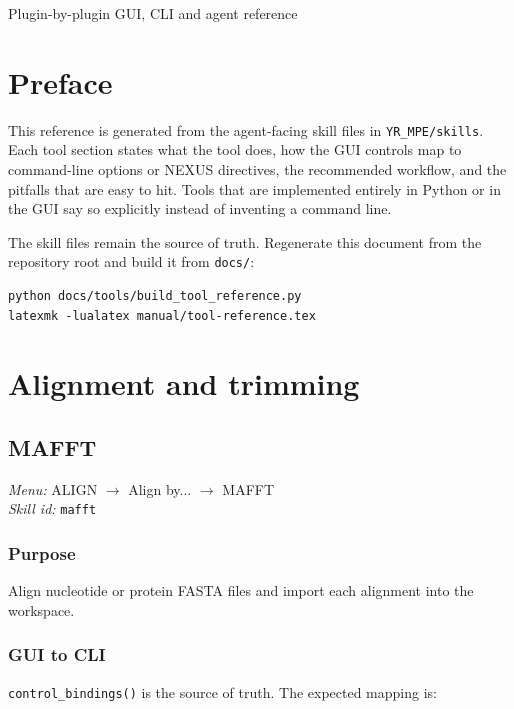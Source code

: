 \documentclass[11pt]{report}
\begin{document}
  {Plugin-by-plugin GUI, CLI and agent reference}
\setcounter{tocdepth}{1}
\tableofcontents
\chapter*{Preface}
This reference is generated from the agent-facing skill files in \texttt{YR\_MPE/skills}. Each tool section states what the tool does, how the GUI controls map to command-line options or NEXUS directives, the recommended workflow, and the pitfalls that are easy to hit. Tools that are implemented entirely in Python or in the GUI say so explicitly instead of inventing a command line.

The skill files remain the source of truth. Regenerate this document from the repository root and build it from \texttt{docs/}:

\begin{lstlisting}
python docs/tools/build_tool_reference.py
latexmk -lualatex manual/tool-reference.tex
\end{lstlisting}

\chapter{Alignment and trimming}
\section{MAFFT}
\noindent\textit{Menu:} ALIGN $\rightarrow$ Align by... $\rightarrow$ MAFFT\\
\noindent\textit{Skill id:} \texttt{mafft}

\subsection{Purpose}

Align nucleotide or protein FASTA files and import each alignment into the workspace.

\subsection{GUI to CLI}

\texttt{control\_\allowbreak bindings\allowbreak ()} is the source of truth. The expected mapping is:
\end{document}

